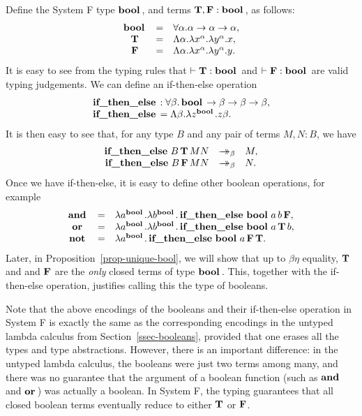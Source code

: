 \documentclass{article}
\begin{document}
Define the System F type $\mathop{\textbf{\bf bool}\,}$, and terms ${\bf T},{\bf F}:\mathop{\textbf{\bf bool}\,}$, as follows:
\[ \begin{array}{ccl}
  \mathop{\textbf{\bf bool}\,} &=& \forall\alpha.\alpha\to\alpha\to\alpha,\\
  {\bf T} &=& \Lambda\alpha.\lambda x^{\alpha}.\lambda y^{\alpha}.x,\\
  {\bf F} &=& \Lambda\alpha.\lambda x^{\alpha}.\lambda y^{\alpha}.y.\\
\end{array}
\]
It is easy to see from the typing rules that $\vdash{\bf T}:\mathop{\textbf{\bf bool}\,}$ and
$\vdash{\bf F}:\mathop{\textbf{\bf bool}\,}$ are valid typing judgements. We can define an
if-then-else operation 
\[ \begin{array}{l}
  \mathop{\textbf{\bf if\_then\_else}\,} : \forall\beta.\mathop{\textbf{\bf bool}\,}\to\beta\to\beta\to\beta,
  \\  \mathop{\textbf{\bf if\_then\_else}\,} = \Lambda\beta.\lambda z^{\mathop{\textbf{\bf bool}\,}}.z\beta.
\end{array}
\]
It is then easy to see that, for any type $B$ and any pair of terms
$M,N:B$, we have
\[ \begin{array}{rcl}
  \ifthenelset B\, \truet\, MN &\redbs& M,\\
  \ifthenelset B\, \falset\, MN &\redbs& N.
\end{array}
\]
Once we have if-then-else, it is easy to define other boolean
operations, for example
\[ \begin{array}{ccl}
  \mathop{\textbf{\bf and}\,} &=& \lambda a^{\mathop{\textbf{\bf bool}\,}}.\lambda b^{\mathop{\textbf{\bf bool}\,}}.\mathop{\textbf{\bf if\_then\_else}\,}\mathop{\textbf{\bf bool}\,} a\,b\,{\bf F},\\
  \mathop{\textbf{\bf or}\,} &=& \lambda a^{\mathop{\textbf{\bf bool}\,}}.\lambda b^{\mathop{\textbf{\bf bool}\,}}.\mathop{\textbf{\bf if\_then\_else}\,}\mathop{\textbf{\bf bool}\,} a\,{\bf T}\,b,\\
  \mathop{\textbf{\bf not}\,} &=& \lambda a^{\mathop{\textbf{\bf bool}\,}}.\mathop{\textbf{\bf if\_then\_else}\,}\mathop{\textbf{\bf bool}\,} a\,{\bf F}\,{\bf T}.
\end{array}
\]
Later, in Proposition~\ref{prop-unique-bool}, we will show that up to
$\beta\eta$ equality, ${\bf T}$ and and ${\bf F}$ are the {\em only}
closed terms of type $\mathop{\textbf{\bf bool}\,}$. This, together with the if-then-else
operation, justifies calling this the type of booleans.

Note that the above encodings of the booleans and their if-then-else
operation in System F is exactly the same as the corresponding
encodings in the untyped lambda calculus from
Section~\ref{ssec-booleans}, provided that one erases all the types
and type abstractions. However, there is an important difference: in
the untyped lambda calculus, the booleans were just two terms among
many, and there was no guarantee that the argument of a boolean
function (such as $\mathop{\textbf{\bf and}\,}$ and $\mathop{\textbf{\bf or}\,}$) was actually a boolean. In
System F, the typing guarantees that all closed boolean terms
eventually reduce to either ${\bf T}$ or ${\bf F}$. 
\end{document}
